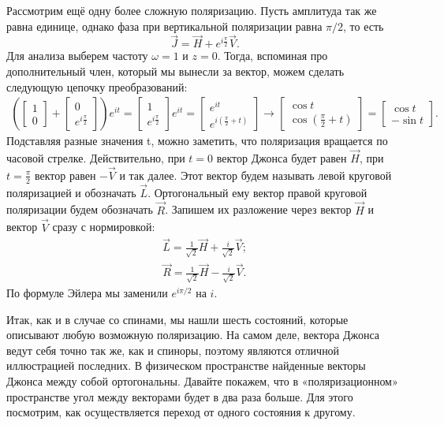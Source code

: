 Рассмотрим ещё одну более сложную поляризацию. Пусть амплитуда так же равна
единице, однако фаза при вертикальной поляризации равна $\pi/2$, то есть
\[
  \Vec{J} = \Vec{H} + e^{i\frac{\pi}{2}}\Vec{V}.
\]
Для анализа выберем частоту $\omega = 1$ и $z = 0$. Тогда, вспоминая про
дополнительный член, который мы вынесли за вектор, можем сделать следующую
цепочку преобразований:
\begin{align*}
  (\begin{bmatrix} 1 \\ 0 \end{bmatrix} + \begin{bmatrix} 0 \\ e^{i\frac{\pi}{2}} \end{bmatrix})e^{it} = \begin{bmatrix} 1 \\ e^{i\frac{\pi}{2}} \end{bmatrix} e^{it} = \begin{bmatrix} e^{it} \\ e^{i(\frac{\pi}{2} + t)} \end{bmatrix} \rightarrow \begin{bmatrix} \cos t \\ \cos(\frac{\pi}{2} + t) \end{bmatrix} = \begin{bmatrix} \cos t \\ -\sin t \end{bmatrix}.
\end{align*}
Подставляя разные значения t, можно заметить, что поляризация вращается по
часовой стрелке. Действительно, при $t = 0$ вектор Джонса будет равен
$\Vec{H}$, при $t = \frac{\pi}{2}$ вектор равен $-\Vec{V}$ и так далее. Этот
вектор будем называть левой круговой поляризацией и обозначать $\Vec{L}$.
Ортогональный ему вектор правой круговой поляризации будем обозначать
$\Vec{R}$. Запишем их разложение через вектор $\Vec{H}$ и вектор $\Vec{V}$
сразу с нормировкой:
\begin{gather*}
  \Vec{L} = \frac{1}{\sqrt{2}}\Vec{H} + \frac{i}{\sqrt{2}}\Vec{V};\\
  \Vec{R} = \frac{1}{\sqrt{2}}\Vec{H} - \frac{i}{\sqrt{2}}\Vec{V}.
\end{gather*}
По формуле Эйлера мы заменили $e^{i\pi/2}$ на $i$.

Итак, как и в случае со спинами, мы нашли шесть состояний, которые описывают
любую возможную поляризацию. На самом деле, вектора Джонса ведут себя точно так
же, как и спиноры, поэтому являются отличной иллюстрацией последних. В
физическом пространстве найденные векторы Джонса между собой ортогональны.
Давайте покажем, что в «поляризационном» пространстве угол между векторами
будет в два раза больше. Для этого посмотрим, как осуществляется переход от
одного состояния к другому.
